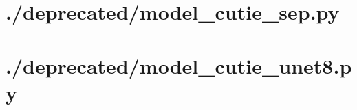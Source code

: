 \documentclass{article}
\begin{document}
    \section{./deprecated/model\_cutie\_sep.py}
    
    \section{./deprecated/model\_cutie\_unet8.py}
    
\end{document}
